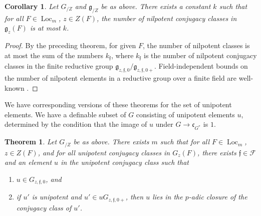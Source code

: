 \documentclass[12pt]{amsart}
\newcommand{\op}[1]{\operatorname{#1}}
\def\s{{\mathfrak{f}}}
\newcommand{\cF}{\mathcal{F}}
\newcommand{\fg}{\mathfrak{g}}
\newcommand{\fc}{\mathfrak{c}}
\theoremstyle{plain}
\newtheorem{theorem}[thm]{Theorem}
\newtheorem{cor}[thm]{Corollary}
\theoremstyle{definition}
\begin{document}
\begin{cor}\label{thm:nilbound}  Let $G_{/Z}$ and $\fg_{/Z}$ be as above.  
There exists a constant $k$ such that for all $F\in \op{Loc}_m$, $z\in
Z(F)$, the number of nilpotent conjugacy classes in $\fg_z(F)$ is at
most $k$.
\end{cor}

\begin{proof} By the preceding theorem, for given $F$, the number of
  nilpotent classes is at most the sum of the numbers $k_\s$, where
  $k_\s$ is the number of nilpotent conjugacy classes in the finite
  reductive group $\fg_{z,\s,0}/\fg_{z,\s,0+}$.  Field-independent
  bounds on the number of nilpotent elements in a reductive
  group over a finite field are well-known \cite{carter1985finite}.
\end{proof}

We have corresponding versions of these theorems for the set of
unipotent elements.  We have a definable subset of $G$ consisting of
unipotent elements $u$, determined by the condition that the image of
$u$ under $G\to \fc_{G^*}$ is $1$.

\begin{theorem}\label{thm:bmg} 
  Let $G_{/Z}$ be as above.  There exists $m$ such that for all $F\in
  \op{Loc}_m$, $z\in Z(F)$, and for all unipotent conjugacy classes in
  $G_z(F)$, there exists $\s\in \cF$ and an element $u$ in the
  unipotent conjugacy class such that
\begin{enumerate}
   \item $u\in G_{z,\s,0}$, and
   \item if $u'$ is unipotent and $u'\in u G_{z,\s,0+}$, then $u$
     lies in the $p$-adic closure of the conjugacy class of $u'$.
\end{enumerate}
\end{theorem}
\end{document}
